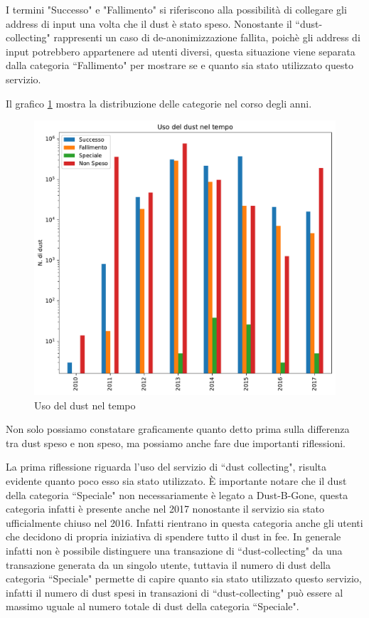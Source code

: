 I termini "Successo" e "Fallimento" si riferiscono alla possibilità di collegare gli address di input una volta che il dust è stato speso. Nonostante il ``dust-collecting" rappresenti un caso di de-anonimizzazione fallita, poichè gli address di input potrebbero appartenere ad utenti diversi, questa situazione viene separata dalla categoria ``Fallimento" per mostrare se e quanto sia stato utilizzato questo servizio.

Il grafico \ref{fig:dust_year} mostra la distribuzione delle categorie nel corso degli anni.
\begin{figure}[h!]
    \centering
    \includegraphics[scale=0.6]{Grafici/uso_del_dust_new.pdf}
    \caption{Uso del dust nel tempo}
    \label{fig:dust_year}
\end{figure}
\FloatBarrier

Non solo possiamo constatare graficamente quanto detto prima sulla differenza tra dust speso e non speso, ma possiamo anche fare due importanti riflessioni. 

La prima riflessione riguarda l'uso del servizio di ``dust collecting", risulta evidente quanto poco esso sia stato utilizzato. È importante notare che il dust della categoria ``Speciale" non necessariamente è legato a Dust-B-Gone, questa categoria infatti è presente anche nel 2017 nonostante il servizio sia stato ufficialmente chiuso nel 2016. Infatti rientrano in questa categoria anche gli utenti che decidono di propria iniziativa di spendere tutto il dust in fee. In generale infatti non è possibile distinguere una transazione di ``dust-collecting" da una transazione generata da un singolo utente, tuttavia il numero di dust della categoria ``Speciale" permette di capire quanto sia stato utilizzato questo servizio, infatti il numero di dust spesi in transazioni di ``dust-collecting" può essere al massimo uguale al numero totale di dust della categoria ``Speciale".  

